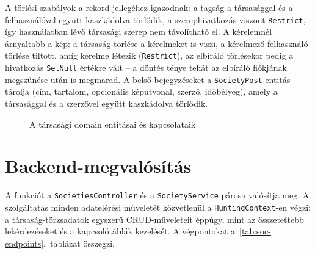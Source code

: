A törlési szabályok a rekord jellegéhez igazodnak: a tagság a társasággal és a felhasználóval
együtt kaszkádolva törlődik, a szerephivatkozás viszont \texttt{Restrict}, így használatban lévő
társasági szerep nem távolítható el. A kérelemnél árnyaltabb a kép: a társaság törlése a
kérelmeket is viszi, a kérelmező felhasználó törlése tiltott, amíg kérelme létezik
(\texttt{Restrict}), az elbíráló törlésekor pedig a hivatkozás \texttt{SetNull} értékre vált --
a döntés ténye tehát az elbíráló fiókjának megszűnése után is megmarad. A belső bejegyzéseket a
\texttt{SocietyPost} entitás tárolja (cím, tartalom, opcionális képútvonal, szerző, időbélyeg),
amely a társasággal és a szerzővel együtt kaszkádolva törlődik.

\begin{figure}[htbp]
	\centering
	\caption{A társasági domain entitásai és kapcsolataik}
	\label{fig:society-domain}
\end{figure}

\section{Backend-megvalósítás}
\label{sec:soc-backend}

A funkciót a \texttt{SocietiesController} és a \texttt{SocietyService} párosa valósítja meg. A
szolgáltatás minden adatelérési műveletét közvetlenül a \texttt{HuntingContext}-en végzi: a
társaság-törzsadatok egyszerű CRUD-műveleteit éppúgy, mint az összetettebb lekérdezéseket és a
kapcsolótáblák kezelését. A végpontokat
a~\ref{tab:soc-endpoints}.~táblázat összegzi.

